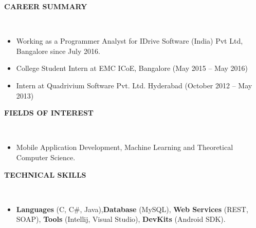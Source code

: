 \documentclass[a4paper,10pt]{article}
\newcommand{\isep}{-2 pt}
\newcommand{\lsep}{-0.5cm}
\newcommand{\resheading}[1]{{\small \colorbox{mygrey}{\begin{minipage}{0.975\textwidth}{\textbf{#1 \vphantom{p\^{E}}}}\end{minipage}}}}
\begin{document}
\medskip

\resheading{\textbf{CAREER SUMMARY} }\\[\lsep]
\begin{itemize} \itemsep \isep
    \item \noindent Working as a Programmer Analyst for IDrive Software (India) Pvt Ltd, Bangalore since July 2016.
    \item \noindent College Student Intern at EMC ICoE, Bangalore (May 2015 – May 2016)
    \item \noindent Intern at Quadrivium Software Pvt. Ltd. Hyderabad (October 2012 – May 2013)
\end{itemize}

\resheading{\textbf{FIELDS OF INTEREST} }\\[\lsep]
\begin{itemize}
    \item \noindent Mobile Application Development, Machine Learning and Theoretical Computer Science.
\end{itemize}

\resheading{\textbf{TECHNICAL SKILLS} }\\[\lsep]
\begin{itemize}
    \item \noindent \textbf{Languages} (C, C\#, Java),\textbf{Database} (MySQL), \textbf{Web Services} (REST, SOAP), \textbf{Tools} (Intellij, Visual Studio),
    \textbf{DevKits} (Android SDK). 
\end{itemize}
\end{document}
